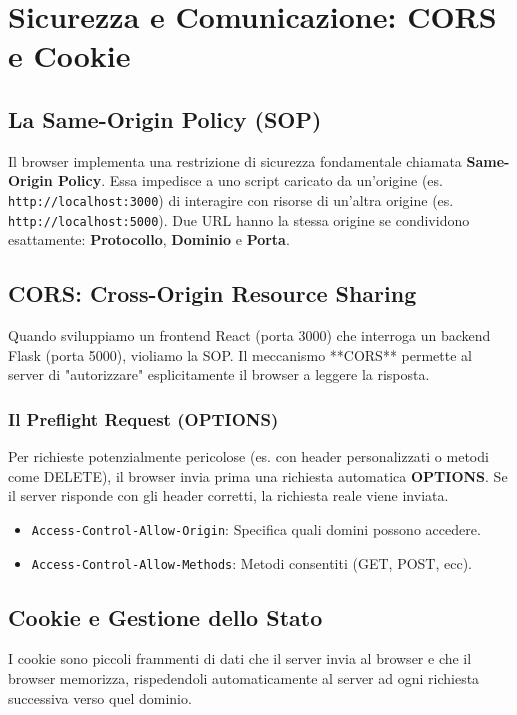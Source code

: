 \documentclass[11pt,a4paper]{report}
\begin{document}
\chapter{Sicurezza e Comunicazione: CORS e Cookie}

\section{La Same-Origin Policy (SOP)}
Il browser implementa una restrizione di sicurezza fondamentale chiamata \textbf{Same-Origin Policy}. Essa impedisce a uno script caricato da un'origine (es. \texttt{http://localhost:3000}) di interagire con risorse di un'altra origine (es. \texttt{http://localhost:5000}).
Due URL hanno la stessa origine se condividono esattamente: \textbf{Protocollo}, \textbf{Dominio} e \textbf{Porta}.

\section{CORS: Cross-Origin Resource Sharing}
Quando sviluppiamo un frontend React (porta 3000) che interroga un backend Flask (porta 5000), violiamo la SOP. Il meccanismo **CORS** permette al server di "autorizzare" esplicitamente il browser a leggere la risposta.

\subsection{Il Preflight Request (OPTIONS)}
Per richieste potenzialmente pericolose (es. con header personalizzati o metodi come DELETE), il browser invia prima una richiesta automatica \textbf{OPTIONS}. Se il server risponde con gli header corretti, la richiesta reale viene inviata.

\begin{itemize}
    \item \texttt{Access-Control-Allow-Origin}: Specifica quali domini possono accedere.
    \item \texttt{Access-Control-Allow-Methods}: Metodi consentiti (GET, POST, ecc).
\end{itemize}

\section{Cookie e Gestione dello Stato}
I cookie sono piccoli frammenti di dati che il server invia al browser e che il browser memorizza, rispedendoli automaticamente al server ad ogni richiesta successiva verso quel dominio.
\end{document}

